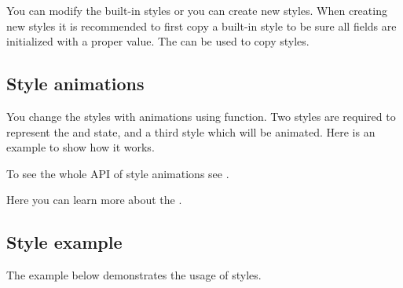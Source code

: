 \documentclass[letterpaper,10pt,english]{sphinxmanual}
\begin{document}
You can modify the built-in styles or you can create new styles. When creating new styles it is recommended to first copy a built-in style to be sure all fields are initialized with a proper value. The  can be used to copy styles.


\subsection{Style animations}
\label{\detokenize{overview/styles:style-animations}}
You change the styles with animations using  function. Two styles are required to represent the  and  state, and a third style which will be animated. Here is an example to show how it works.

\begin{sphinxVerbatim}[commandchars=\\\{\}]
 
                                                 
    
                             
                                               
\end{sphinxVerbatim}

To see the whole API of style animations see .

Here you can learn more about the {\hyperref[\detokenize{overview/animations::doc}]{}}.


\subsection{Style example}
\label{\detokenize{overview/styles:style-example}}
The example below demonstrates the usage of styles.
\end{document}
